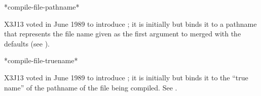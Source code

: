 \begin{defun}[Variable]
*compile-file-pathname*

X3J13 voted in June 1989  to introduce ;
it is initially  but  binds it to a pathname that
represents the file name given as the first argument to  merged
with the defaults (see ).
\end{defun}

\begin{defun}[Variable]
*compile-file-truename*

X3J13 voted in June 1989  to introduce ;
it is initially  but  binds it to the ``true name'' of
the pathname of the file being compiled.  See .
\end{defun}

